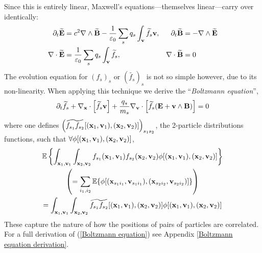     Since this is entirely linear, Maxwell's equations—themselves linear—carry over identically:
    \begin{align*}
        \partial_{t}\widetilde{\mathbf{E}}  &=  c^{2}\nabla\wedge\widetilde{\mathbf{B}} - \frac{1}{\varepsilon_{0}}\sum_{s}q_{s}\int_{\mathbf{v}}\widetilde{f_{s}}\mathbf{v},  &
        \partial_{t}\widetilde{\mathbf{B}}  &=  - \nabla\wedge\widetilde{\mathbf{E}}  \\
        \nabla\cdot\widetilde{\mathbf{E}}  &=  \frac{1}{\varepsilon_{0}}\sum_{s}q_{s}\int_{\mathbf{v}}\widetilde{f_{s}},  &
        \nabla\cdot\widetilde{\mathbf{B}}  &=  0
    \end{align*}
    The evolution equation for $(f_{s})_{s}$ or $\left(\widetilde{f_{s}}\right)_{s}$ is not so simple however, due to its non-linearity. When applying this technique we derive the ``\emph{Boltzmann equation}'',
    \begin{equation}\label{Boltzmann equation}
        \partial_{t}\widetilde{f_{s}} + \nabla_{\mathbf{x}}\cdot\left[\widetilde{f_{s}}\mathbf{v}\right] + \frac{q_{s}}{m_{s}}\nabla_{\mathbf{v}}\cdot\left[\widetilde{f_{s}}(\mathbf{E} + \mathbf{v}\wedge\mathbf{B})\right]  =  0
    \end{equation}
    where one defines $\left(\widetilde{f_{s_{1}}f_{s_{2}}}[(\mathbf{x}_{1}, \mathbf{v}_{1}), (\mathbf{x}_{2}, \mathbf{v}_{2})]\right)_{s_{1}s_{2}}$, the 2-particle distributions functions, such that $\forall \phi[(\mathbf{x}_{1}, \mathbf{v}_{1}), (\mathbf{x}_{2}, \mathbf{v}_{2})]$,
    \begin{multline}
        \mathbb{E}\left\{\int_{\mathbf{x}_{1}, \mathbf{v}_{1}}\int_{\mathbf{x}_{2}, \mathbf{v}_{2}}f_{s_{1}}(\mathbf{x}_{1}, \mathbf{v}_{1})f_{s_{2}}(\mathbf{x}_{2}, \mathbf{v}_{2})\phi[(\mathbf{x}_{1}, \mathbf{v}_{1}), (\mathbf{x}_{2}, \mathbf{v}_{2})]\right\}  \\
        \left(=  \sum_{i_{1}, i_{2}}\mathbb{E}\{\phi[(\mathbf{x}_{s_{1}i_{1}}, \mathbf{v}_{s_{1}i_{1}}), (\mathbf{x}_{s_{2}i_{2}}, \mathbf{v}_{s_{2}i_{2}})]\}\right)  \\
        =  \int_{\mathbf{x}_{1}, \mathbf{v}_{1}}\int_{\mathbf{x}_{2}, \mathbf{v}_{2}}\widetilde{f_{s_{1}}f_{s_{2}}}[(\mathbf{x}_{1}, \mathbf{v}_{1}), (\mathbf{x}_{2}, \mathbf{v}_{2})]\phi[(\mathbf{x}_{1}, \mathbf{v}_{1}), (\mathbf{x}_{2}, \mathbf{v}_{2})]
    \end{multline}
    These capture the nature of how the positions of pairs of particles are correlated. For a full derivation of (\ref{Boltzmann equation}) see Appendix \ref{Boltzmann equation derivation}.

    

